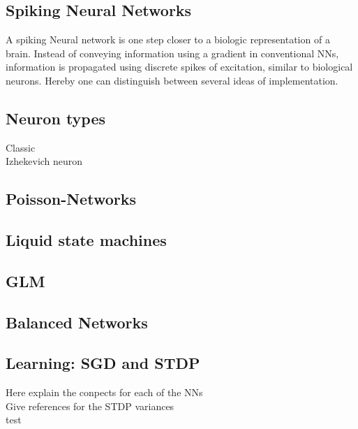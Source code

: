 \subsection{Spiking Neural Networks}
A spiking Neural network is one step closer to a biologic representation of a brain. Instead of conveying information using a gradient in conventional \ac{NN}s, information is propagated using discrete spikes of excitation, similar to biological neurons. Hereby one can distinguish between several ideas of implementation.


\subsection{Neuron types}
Classic\\
Izhekevich neuron\\

\subsection{Poisson-Networks}

\subsection{Liquid state machines}

\subsection{GLM}

\subsection{Balanced Networks}

\subsection{Learning: SGD and STDP}
Here explain the conpects for each of the NNs\\
Give references for the STDP variances\\
test\\
